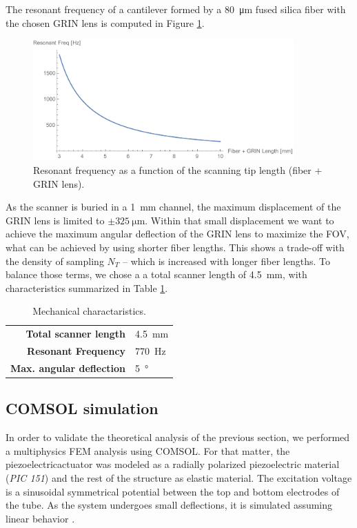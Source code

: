 The resonant frequency of a cantilever formed by a \SI{80}{\micro\meter} fused silica fiber with the chosen GRIN lens is computed in Figure \ref{fig:freq}.

\begin{figure}[h!]\centering
      \includegraphics[width=10cm]{figures/30_DesignSimulation/Mechanical/fres.pdf}
      \caption{Resonant frequency as a function of the scanning tip length (fiber + GRIN lens).}
      \label{fig:freq}
\end{figure}

As the scanner is buried in a \SI{1}{\milli\meter} channel, the maximum displacement of the GRIN lens is limited to $\pm\SI{325}{\micro\meter}$. Within that small displacement we want to achieve the maximum angular deflection of the GRIN lens to maximize the FOV, what can be achieved by using shorter fiber lengths. This shows a trade-off with the density of sampling $N_{T}$ -- which is increased with longer fiber lengths. To balance those terms, we chose a a total scanner length of \SI{4.5}{\milli\meter}, with characteristics summarized in Table \ref{tab:mech}.

\begin{table}[h!]\centering
	\begin{tabular}{rl}\\
		\hline
		\textbf{Total scanner length} & \SI{4.5}{\milli\meter} \\ 
		\textbf{Resonant Frequency} & \SI{770}{\hertz} \\ 
		\textbf{Max. angular deflection} & \SI{5}{\degree} \\ 
		\hline
	\end{tabular} 
    \caption{Mechanical charactaristics.}
    \label{tab:mech}
\end{table}

\subsection{COMSOL simulation}
In order to validate the theoretical analysis of the previous section, we performed a multiphysics FEM analysis using COMSOL. For that matter, the piezoelectricactuator was modeled as a radially polarized piezoelectric material (\textit{PIC 151}) and the rest of the structure as elastic material. The excitation voltage is a sinusoidal symmetrical potential between the top and bottom electrodes of the tube. As the system undergoes small deflections, it is simulated assuming linear behavior \cite{Fertis2006}.

